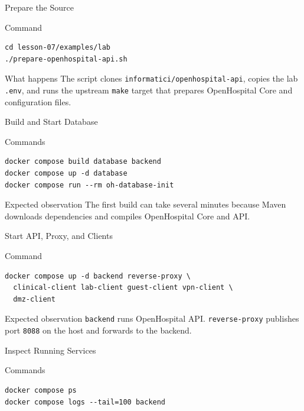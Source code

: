 \documentclass[presentation]{beamer}
\begin{document}
\begin{frame}[fragile,c]{Prepare the Source}
\begin{block}{Command}
\begin{verbatim}
cd lesson-07/examples/lab
./prepare-openhospital-api.sh
\end{verbatim}
\end{block}

\begin{exampleblock}{What happens}
The script clones \texttt{informatici/openhospital-api}, copies the lab \texttt{.env}, and runs the
upstream \texttt{make} target that prepares OpenHospital Core and configuration files.
\end{exampleblock}
\end{frame}

\begin{frame}[fragile,c]{Build and Start Database}
\begin{block}{Commands}
\begin{verbatim}
docker compose build database backend
docker compose up -d database
docker compose run --rm oh-database-init
\end{verbatim}
\end{block}

\begin{exampleblock}{Expected observation}
The first build can take several minutes because Maven downloads dependencies and compiles
OpenHospital Core and API.
\end{exampleblock}
\end{frame}

\begin{frame}[fragile,c]{Start API, Proxy, and Clients}
\begin{block}{Command}
\begin{verbatim}
docker compose up -d backend reverse-proxy \
  clinical-client lab-client guest-client vpn-client \
  dmz-client
\end{verbatim}
\end{block}

\begin{exampleblock}{Expected observation}
\texttt{backend} runs OpenHospital API. \texttt{reverse-proxy} publishes port \texttt{8088} on the
host and forwards to the backend.
\end{exampleblock}
\end{frame}

\begin{frame}[fragile,c]{Inspect Running Services}
\begin{block}{Commands}
\begin{verbatim}
docker compose ps
docker compose logs --tail=100 backend
\end{verbatim}
\end{block}
\end{frame}
\end{document}
